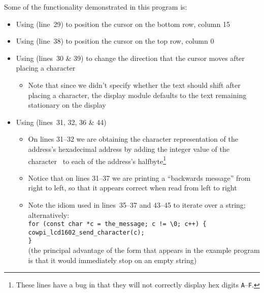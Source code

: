 {    Some of the functionality demonstrated in this program is:
    \begin{itemize}
        \item Using \hyperlink{function:cowpi_lcd1602_place_cursor}{} (line~29) to position the cursor on the bottom row, column 15
        \item Using \hyperlink{function:cowpi_lcd1602_return_home}{} (line~38) to position the cursor on the top row, column 0
        \item Using \hyperlink{function:cowpi_lcd1602_send_command}{} (lines~30 \& 39) to change the direction that the cursor moves after placing a character
            \begin{itemize}
                \item Note that since we didn't specify whether the text should shift after placing a character, the display module defaults to the text remaining stationary on the display
            \end{itemize}
        \item Using \hyperlink{function:cowpi_lcd1602_send_character}{} (lines~31, 32, 36 \& 44)
            \begin{itemize}
                \item On lines 31--32 we are obtaining the character representation of the address's hexadecimal address by adding the integer value of the character \textquotesingle\ to each of the address's halfbyte\footnote{These lines have a bug in that they will not correctly display hex digits \texttt{A}--\texttt{F}.}
                \item Notice that on lines 31--37 we are printing a ``backwards message'' from right to left, so that it appears correct when read from left to right
                \item Note the idiom used in lines~35--37 and 43--45 to iterate over a string;
                    alternatively: \\ %
                    \texttt{for (const char *c = the\_message; c != \textquotesingle\textbackslash 0\textquotesingle; c++) \{ \\
                    \hspace*{1cm}cowpi\_lcd1602\_send\_character(c); \\
                    \}} \\
                    (the principal advantage of the form that appears in the example program is that it would immediately stop on an empty string)
            \end{itemize}
    \end{itemize}

}
